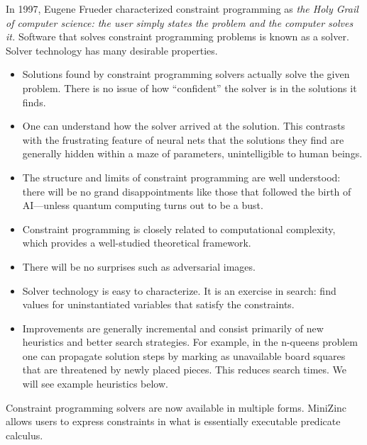 In 1997, Eugene Frueder characterized constraint programming as \textit{the Holy Grail of computer science: the user simply states the problem and the computer solves it.}\cite{freuder1997pursuit}  Software that solves constraint programming problems is known as a solver. Solver technology has many desirable properties. 
\begin{itemize}
    \item Solutions found by constraint programming solvers actually solve the given problem. There is no issue of how ``confident'' the solver is in the solutions it finds.
    
    \item One can understand how the solver arrived at the solution. This contrasts with the frustrating feature of neural nets that the solutions they find are generally hidden within a maze of parameters, unintelligible to human beings. 

    \item  The structure and limits of constraint programming are well understood: there will be no grand disappointments like those that followed the birth of AI---unless quantum computing turns out to be a bust. 
    
    \item Constraint programming is closely related to computational complexity, which provides a well-studied theoretical framework. 
    
    \item There will be no surprises such as adversarial images. 

    \item Solver technology is easy to characterize. It is an exercise in search: find values for uninstantiated variables that satisfy the constraints.

    \item Improvements are generally incremental and consist primarily of new heuristics and better search strategies. For example, in the n-queens problem one can propagate solution steps by marking as unavailable board squares that are threatened by newly placed pieces. This reduces search times. We will see  example heuristics below.

\end{itemize}

Constraint programming solvers are now available in multiple forms. MiniZinc\cite{wallace2020problem} allows users to express constraints in what is essentially executable predicate calculus.

